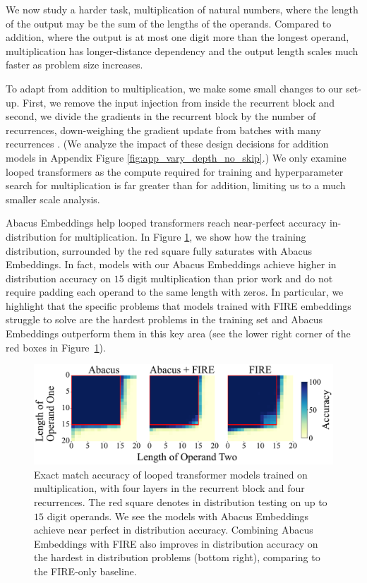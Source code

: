 \documentclass{article}
\begin{document}
We now study a harder task, multiplication of natural numbers, where the length of the output may be the sum of the lengths of the operands.
Compared to addition, where the output is at most one digit more than the longest operand, multiplication has longer-distance dependency and the output length scales much faster as problem size increases.

To adapt from addition to multiplication, we make some small changes to our set-up.
First, we remove the input injection from inside the recurrent block and second, we divide the gradients in the recurrent block by the number of recurrences, down-weighing the gradient update from batches with many recurrences \citep{bansal2022endtoend}.
(We analyze the impact of these design decisions for addition models in Appendix Figure \ref{fig:app_vary_depth_no_skip}.)
We only examine looped transformers as the compute required for training and hyperparameter search for multiplication is far greater than for addition, limiting us to a much smaller scale analysis.

Abacus Embeddings help looped transformers reach near-perfect accuracy in-distribution for multiplication.
In Figure \ref{fig:mul}, we show how the training distribution, surrounded by the red square fully saturates with Abacus Embeddings.
In fact, models with our Abacus Embeddings achieve higher in distribution accuracy on \(15\) digit multiplication than prior work \citep{shen2023positional} and do not require padding each operand to the same length with zeros.
In particular, we highlight that the specific problems that models trained with FIRE embeddings struggle to solve are the hardest problems in the training set and Abacus Embeddings outperform them in this key area (see the lower right corner of the red boxes in Figure~\ref{fig:mul}).

\begin{figure}[b!]
    \centering
    \includegraphics[width=\textwidth]{Figures/grids_plot_14_06.pdf}
    \caption{
    Exact match accuracy of looped transformer models trained on multiplication, with four layers in the recurrent block and four recurrences.
    The red square denotes in distribution testing on up to \(15\) digit operands.
    We see the models with Abacus Embeddings achieve near perfect in distribution accuracy.
    Combining Abacus Embeddings with FIRE also improves in distribution accuracy on the hardest in distribution problems (bottom right), comparing to the FIRE-only baseline.
    }
    \label{fig:mul}
\end{figure}
\end{document}
